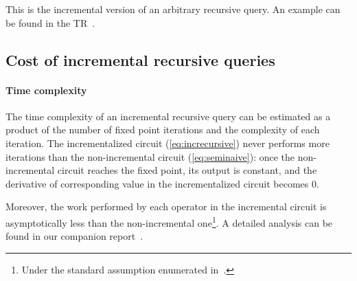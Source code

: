 \vspace{1mm}
This is the incremental version of an arbitrary recursive query.  An example can be found in the TR~\cite{tr}.


\subsection{Cost of incremental recursive queries}

\paragraph{Time complexity}

The time complexity of an incremental recursive query can be estimated as a product of
the number of fixed point iterations and the complexity of each iteration. The
incrementalized circuit (\ref{eq:increcursive}) never performs more
iterations than the non-incremental circuit (\ref{eq:seminaive}):
once the non-incremental circuit reaches the fixed point, its output is constant, 
and the derivative of corresponding value in the incrementalized circuit becomes 0.

Moreover, the work performed by each operator in the incremental
circuit is asymptotically less than the non-incremental
one\footnote{Under the standard assumption enumerated
in~.}.  A detailed analysis can be found in our
companion report~\cite{tr}.


